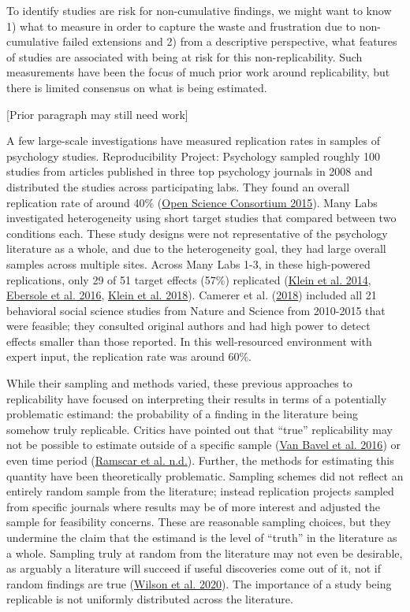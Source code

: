 \documentclass[
  english,
  a4paper,
]{article}
\begin{document}
To identify studies are risk for non-cumulative findings, we might want to know 1) what to measure in order to capture the waste and frustration due to non-cumulative failed extensions and 2) from a descriptive perspective, what features of studies are associated with being at risk for this non-replicability. Such measurements have been the focus of much prior work around replicability, but there is limited consensus on what is being estimated.

{[}Prior paragraph may still need work{]}

A few large-scale investigations have measured replication rates in samples of psychology studies. Reproducibility Project: Psychology sampled roughly 100 studies from articles published in three top psychology journals in 2008 and distributed the studies across participating labs. They found an overall replication rate of around 40\% (\protect\hyperlink{ref-openscienceconsortium2015}{Open Science Consortium 2015}). Many Labs investigated heterogeneity using short target studies that compared between two conditions each. These study designs were not representative of the psychology literature as a whole, and due to the heterogeneity goal, they had large overall samples across multiple sites. Across Many Labs 1-3, in these high-powered replications, only 29 of 51 target effects (57\%) replicated (\protect\hyperlink{ref-klein2014}{Klein et al. 2014}, \protect\hyperlink{ref-ebersole2016}{Ebersole et al. 2016}, \protect\hyperlink{ref-klein2018}{Klein et al. 2018}). Camerer et al. (\protect\hyperlink{ref-camerer2018}{2018}) included all 21 behavioral social science studies from Nature and Science from 2010-2015 that were feasible; they consulted original authors and had high power to detect effects smaller than those reported. In this well-resourced environment with expert input, the replication rate was around 60\%.

While their sampling and methods varied, these previous approaches to replicability have focused on interpreting their results in terms of a potentially problematic estimand: the probability of a finding in the literature being somehow truly replicable. Critics have pointed out that ``true'' replicability may not be possible to estimate outside of a specific sample (\protect\hyperlink{ref-vanbavel2016}{Van Bavel et al. 2016}) or even time period (\protect\hyperlink{ref-ramscar}{Ramscar et al. n.d.}). Further, the methods for estimating this quantity have been theoretically problematic. Sampling schemes did not reflect an entirely random sample from the literature; instead replication projects sampled from specific journals where results may be of more interest and adjusted the sample for feasibility concerns. These are reasonable sampling choices, but they undermine the claim that the estimand is the level of ``truth'' in the literature as a whole. Sampling truly at random from the literature may not even be desirable, as arguably a literature will succeed if useful discoveries come out of it, not if random findings are true (\protect\hyperlink{ref-wilson2020}{Wilson et al. 2020}). The importance of a study being replicable is not uniformly distributed across the literature.
\end{document}
